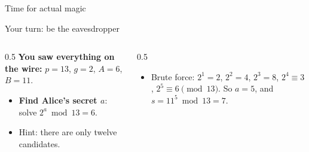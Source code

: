 \ifdefined\PRESENTATION\else\PassOptionsToClass{handout}{beamer}\fi\documentclass[aspectratio=169, lualatex]{beamer}
\begin{document}
\begin{frame}{Time for actual magic}
\end{frame}

\begin{frame}{Your turn: be the eavesdropper}
	\begin{columns}[c]
		\begin{column}{0.5\textwidth}
			\textbf{You saw everything on the wire:} $p = 13$, $g = 2$, $A = 6$, $B = 11$.
			\vspace{0.3cm}
			\begin{itemize}
				\item \textbf{Find Alice's secret $a$}: solve $2^{a} \bmod 13 = 6$.
				\item Hint: there are only twelve candidates.
			\end{itemize}
		\end{column}
		\begin{column}{0.5\textwidth}
			\pause
			\begin{itemize}
				\item Brute force: $2^1 = 2$, $2^2 = 4$, $2^3 = 8$, $2^4 \equiv 3$, $2^5 \equiv 6 \pmod{13}$. So $a = 5$, and $s = 11^{5} \bmod 13 = 7$.
			\end{itemize}
			\pause
		\end{column}
	\end{columns}
\end{frame}
\end{document}
